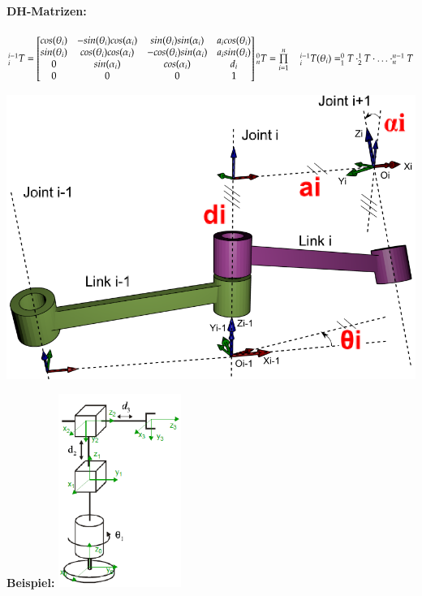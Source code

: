 \begin{minipage}{0.55\linewidth}
    \textbf{DH-Matrizen: }\\ \\
    $ ^{i-1}_{i}T =
    \begin{bmatrix}
    cos(\theta_i) & -sin(\theta_i) cos(\alpha_i) &  sin(\theta_i) sin(\alpha_i) & a_i cos(\theta_i)\\
    sin(\theta_i) &  cos(\theta_i) cos(\alpha_i) & -cos(\theta_i) sin(\alpha_i) & a_i sin(\theta_i)\\
    0			  &  sin(\alpha_i)				 &  cos(\alpha_i)				& d_i\\
    0			  &  0							 &  0							& 1\\
    \end{bmatrix}\\
    ^{0}_{n}T = \prod\limits_{i=1}^{n} \quad ^{i-1}_{i}T(\theta_{i}) = ^{0}_{1}T \cdot ^{1}_{2}T \cdot \ldots \cdot ^{n-1}_{n}T $
\end{minipage}
\begin{minipage}{0.45\linewidth}
    \vspace{-1cm}
    \includegraphics[width=\linewidth]{./bilder/DHparameters}
\end{minipage}
\enlargethispage{1cm}
\begin{minipage}{3cm}
    \textbf{Beispiel:}
    \includegraphics[width=4cm]{./bilder/denavitgrafik} \\
\end{minipage}
